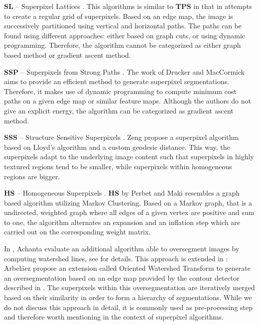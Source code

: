 \textbf{SL} -- Superpixel Lattices \cite{MoorePrinceWarrellMohammedJones:2008}. This algorithms is similar to \textbf{TPS} in that in attempts to create a regular grid of superpixels. Based on an edge map, the image is successively partitioned using vertical and horizontal paths. The paths can be found using different approaches: either based on graph cuts, or using dynamic programming. Therefore, the algorithm cannot be categorized as either graph based method or gradient ascent method.

\textbf{SSP} -- Superpixels from Strong Paths \cite{DruckerMacCormick:2009}. The work of Drucker and MacCormick aims to provide an efficient method to generate superpixel segmentations. Therefore, it makes use of dynamic programming to compute minimum cost paths on a given edge map or similar feature maps. Although the authors do not give an explicit energy, the algorithm can be categorized as gradient ascent method.

\textbf{SSS} -- Structure Sensitive Superpixels \cite{ZengWangWangGanZha:2011}. Zeng \etal propose a superpixel algorithm based on Lloyd's algorithm and a custom geodesic distance. This way, the superpixels adapt to the underlying image content such that superpixels in highly textured regions tend to be smaller, while superpixels within homogeneous regions are bigger.

\textbf{HS} -- Homogeneous Superpixels \cite{PerbetStengerMaki:2012}. \textbf{HS} by Perbet and Maki resembles a graph based algorithm utilizing Markov Clustering. Based on a Markov graph, that is a undirected, weighted graph where all edges of a given vertex are positive and sum to one, the algorithm alternates an expansion and an inflation step which are carried out on the corresponding weight matrix.

In \cite{AchantaShajiSmithLucchiFuaSuesstrunk:2012}, Achanta \etal evaluate an additional algorithm able to oversegment images by computing watershed lines, see \cite{VincentSoille:1991} for details. This approach is extended in \cite{ArbelaezMaireFowlkesMalik:2009}: Arbel\'aez \etal propose an extension called Oriented Watershed Transform to generate an oversegmentation based on an edge map provided by the contour detector described in \cite{ArbelaezMaireFowlkesMalik:2011}. The superpixels within this oversegmentation are iteratively merged based on their similarity in order to form a hierarchy of segmentations. While we do not discuss this approach in detail, it is commonly used as pre-processing step \cite{SilbermanHoiemKohliFergus:2012,RenBoFox:2012} and therefore worth mentioning in the context of superpixel algorithms.

